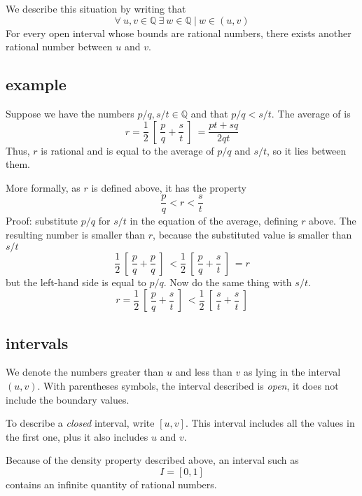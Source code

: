 \documentclass[11pt, oneside]{article}
\begin{document}
We describe this situation by writing that
\[ \forall \ u,v \in \mathbb{Q} \ \exists \ w \in \mathbb{Q} \ | \ w \in (u,v) \]
For every open interval whose bounds are rational numbers, there exists another rational number between $u$ and $v$.

\subsection*{example}
Suppose we have the numbers $p/q, s/t \in \mathbb{Q}$ and that $p/q < s/t$.  The average of is
\[ r = \frac{1}{2} \ [ \  \frac{p}{q} + \frac{s}{t} \ ] \ = \frac{pt+sq}{2qt} \]
Thus, $r$ is rational and is equal to the average of $p/q$ and $s/t$, so it lies between them.  

More formally, as $r$ is defined above, it has the property
\[ \frac{p}{q} < r < \frac{s}{t} \]
Proof:  substitute $p/q$ for $s/t$ in the equation of the average, defining $r$ above.  The resulting number is smaller than $r$, because the substituted value is smaller than $s/t$
\[ \frac{1}{2} \ [ \  \frac{p}{q} + \frac{p}{q} \ ] \ < \frac{1}{2} \ [ \  \frac{p}{q} + \frac{s}{t} \ ] \  = r \]
but the left-hand side is equal to $p/q$.  Now do the same thing with $s/t$.
\[ r = \frac{1}{2} \ [ \  \frac{p}{q} + \frac{s}{t} \ ] \ < \frac{1}{2} \ [ \  \frac{s}{t} + \frac{s}{t} \ ]  \]

\subsection*{intervals}
We denote the numbers greater than $u$ and less than $v$ as lying in the interval $(u,v)$.  With parentheses symbols, the interval described is \emph{open}, it does not include the boundary values.

To describe a \emph{closed} interval, write $[u,v]$.  This interval includes all the values in the first one, plus it also includes $u$ and $v$.

Because of the density property described above, an interval such as
\[ I = [0,1] \]
contains an infinite quantity of rational numbers.
\end{document}
